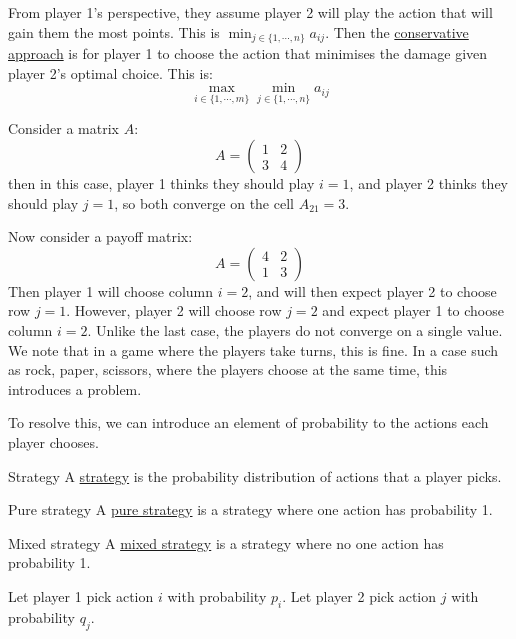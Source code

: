 \documentclass[../Main.tex]{subfiles}
\begin{document}
From player 1's perspective, they assume player 2 will play the action that will gain them the most points. This is $\min_{j \in \{1, \cdots, n\}} a_{ij}$.
Then the \underline{conservative approach} is for player 1 to choose the action that minimises the damage given player 2's optimal choice. This is:
\begin{equation*}
    \max_{i \in \{1, \cdots, m\}} \min_{j \in \{1, \cdots, n\}} a_{ij}
\end{equation*}
\begin{example}
    Consider a matrix $A$:
    \begin{equation*}
        A =
        \begin{pmatrix}
            1 & 2 \\
            3 & 4
        \end{pmatrix}
    \end{equation*}
    then in this case, player 1 thinks they should play $i = 1$, and player 2 thinks they should play $j = 1$, so both converge on the cell $A_{21} = 3$.
\end{example}
\begin{example}
    Now consider a payoff matrix:
    \begin{equation*}
        A =
        \begin{pmatrix}
            4 & 2 \\
            1 & 3
        \end{pmatrix} 
    \end{equation*}
    Then player 1 will choose column $i = 2$, and will then expect player 2 to choose row $j = 1$. However, player 2 will choose row $j = 2$ and expect player 1 to choose column $i = 2$. Unlike the last case, the players do not converge on a single value. We note that in a game where the players take turns, this is fine. In a case such as rock, paper, scissors, where the players choose at the same time, this introduces a problem.
\end{example}
To resolve this, we can introduce an element of probability to the actions each player chooses.
\begin{definition}{Strategy}
    A \underline{strategy} is the probability distribution of actions that a player picks.
\end{definition}
\begin{definition}{Pure strategy}
    A \underline{pure strategy} is a strategy where one action has probability 1.
\end{definition}
\begin{definition}{Mixed strategy}
    A \underline{mixed strategy} is a strategy where no one action has probability 1.
\end{definition}
Let player 1 pick action $i$ with probability $p_i$. Let player 2 pick action $j$ with probability $q_j$.
\end{document}
